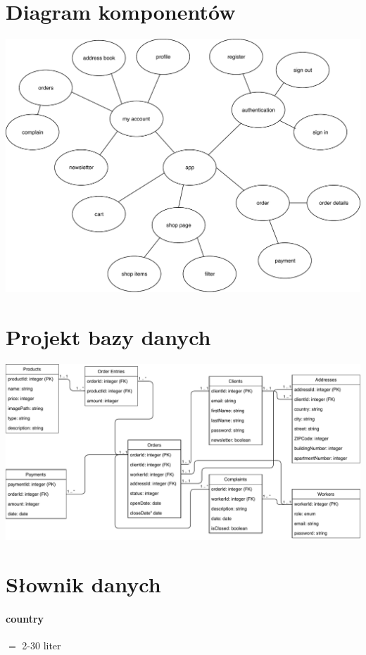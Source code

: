\documentclass[10pt]{report}
\begin{document}
	
	\section{Diagram komponentów}
	\begin{center}
		\includegraphics[width=500pt]{components.pdf}
	\end{center}


	\section{Projekt bazy danych}
		\includegraphics[width=500pt]{database.pdf}
		 


\section{Słownik danych}

		\paragraph{country} $=$ 2-30 liter
\end{document}
